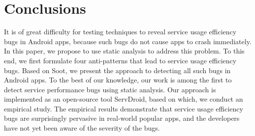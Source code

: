 \documentclass[sigconf,review, anonymous]{acmart}
\begin{document}
\section{Conclusions}\label{conclusion}
It is of great difficulty for testing techniques to reveal service usage efficiency bugs in Android apps, because such bugs do not cause apps to crash immediately. In this paper, we propose to use static analysis to address this problem. To this end, we first formulate four anti-patterns that lead to service usage efficiency bugs. Based on {\sf Soot}, we present the approach to detecting all such bugs in Android apps. To the best of our knowledge, our work is among the first to detect service performance bugs using static analysis. Our approach is implemented as an open-source tool {\sf ServDroid}, based on which, we conduct an empirical study. The empirical results demonstrate that service usage efficiency bugs are surprisingly pervasive in real-world popular apps, and the developers have not yet been aware of the severity of the bugs.



\end{document}
